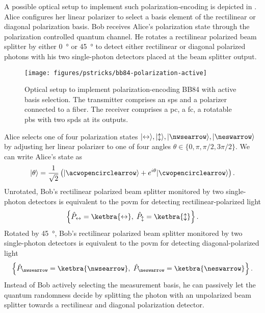 A possible optical setup to implement such polarization-encoding is depicted in .
Alice configures her linear polarizer to select a basis element of the rectilinear or diagonal polarization basis. Bob receives Alice's polarization state through the polarization controlled quantum channel. He rotates a rectilinear polarized beam splitter by either \SI{0}{\degree} or \SI{45}{\degree} to detect either rectilinear or diagonal polarized photons with his two single-photon detectors placed at the beam splitter output.
\begin{figure}[htb]
	\centering
	\texttt{[image: figures/pstricks/bb84-polarization-active]}
	\caption{Optical setup to implement polarization-encoding BB84 with active basis selection. The transmitter comprises an \gls{sps} and a polarizer connected to a fiber. The receiver comprises a \gls{pc}, a \gls{fc}, a rotatable \gls{pbs} with two \gls{spd}s at its outputs.}\label{fig:polarization_encoding_active}
\end{figure}
Alice selects one of four polarization states $\ket{\leftrightarrow},\ket{\updownarrow},\ket{\nwsearrow},\ket{\neswarrow}$ by adjusting her linear polarizer to one of four angles $\theta\in\{0,\pi,\pi/2,3\pi/2\}$.
We can write Alice's state as
\begin{equation}
	\ket{\theta}
	=
	\frac{1}{\sqrt{2}}
	\left(
		\ket{\acwopencirclearrow}
		+
		e^{i\theta}
		\ket{\cwopencirclearrow}
	\right)
	.
\end{equation}
Unrotated, Bob's rectilinear polarized beam splitter monitored by two single-photon detectors is equivalent to the \gls{povm} for detecting rectilinear-polarized light
\begin{equation}
	\left\{
		\hat{P}_{\leftrightarrow}
		=
		\ketbra{\leftrightarrow},
		\;
		\hat{P}_{\updownarrow}
		=
		\ketbra{\updownarrow}
	\right\}
	.
\end{equation}
Rotated by \SI{45}{\degree}, Bob's rectilinear polarized beam splitter monitored by two single-photon detectors is equivalent to the \gls{povm} for detecting diagonal-polarized light
\begin{equation}
	\left\{
		\hat{P}_{\nwsearrow}
		=
		\ketbra{\nwsearrow},
		\;
		\hat{P}_{\neswarrow}
		=
		\ketbra{\neswarrow}
	\right\}
	.
\end{equation}
Instead of Bob actively selecting the measurement basis, he can passively let the quantum randomness decide by splitting the photon with an unpolarized beam splitter towards a rectilinear and diagonal polarization detector.
